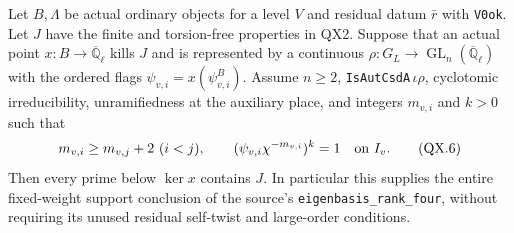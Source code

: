 \begin{proposition}
\label{claim:QX3}
Let $B,\Lambda$ be actual ordinary objects for a level $V$ and
residual datum $\bar r$ with \texttt{V0ok}.  Let $J$ have the
finite and torsion-free properties in QX2.  Suppose that an actual
point $x:B\to\overline{\mathbb Q}_\ell$ kills $J$ and is represented
by a continuous $\rho:G_L\to\operatorname{GL}_n
(\overline{\mathbb Q}_\ell)$ with the ordered flags
$\psi_{v,i}=x(\psi^B_{v,i})$.  Assume $n\ge2$,
\texttt{IsAutCsdA}$\,\iota\rho$, cyclotomic irreducibility,
unramifiedness at the auxiliary place, and integers $m_{v,i}$ and
$k>0$ such that
\[
 m_{v,i}\ge m_{v,j}+2\ (i<j),\qquad
       (\psi_{v,i}\chi^{-m_{v,i}})^k=1
                 \quad\hbox{on }I_v.
       \tag{QX.6}
\]
Then every prime below $\ker x$ contains $J$.
In particular this supplies the entire fixed-weight support
conclusion of the source's \texttt{eigenbasis\_rank\_four}, without
requiring its unused residual self-twist and large-order conditions.
\end{proposition}
